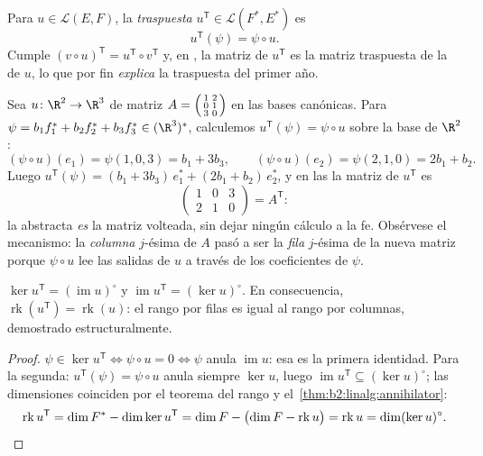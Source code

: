 \begin{definition}\label{def:b2:linalg:transpose}
Para $u \in \mathcal{L}(E, F)$, la \emph{traspuesta} $u^{\mathsf T} \in \mathcal{L}(F^*, E^*)$ es
\[
u^{\mathsf T}(\psi) = \psi \circ u .
\]
Cumple $(v \circ u)^{\mathsf T} = u^{\mathsf T} \circ v^{\mathsf T}$ y,
en , la matriz de $u^{\mathsf T}$ es la matriz
traspuesta de la de $u$, lo que por fin \emph{explica} la traspuesta
del primer año.
\end{definition}

\begin{example}\label{ex:b2:linalg:transposework}
Sea $u \colon \R^2 \to \R^3$ de matriz $A =
\begin{psmallmatrix} 1 & 2\\ 0 & 1\\ 3 & 0\end{psmallmatrix}$ en
las bases canónicas. Para $\psi = b_1f_1^* + b_2f_2^* + b_3f_3^*
\in (\R^3)^*$, calculemos $u^{\mathsf T}(\psi) = \psi \circ u$
sobre la base de $\R^2$:
\[
(\psi \circ u)(e_1) = \psi(1, 0, 3) = b_1 + 3b_3,
\qquad
(\psi \circ u)(e_2) = \psi(2, 1, 0) = 2b_1 + b_2 .
\]
Luego $u^{\mathsf T}(\psi) = (b_1 + 3b_3)\,e_1^* + (2b_1 +
b_2)\,e_2^*$, y en las  la matriz de $u^{\mathsf T}$
es
\[
\begin{pmatrix} 1 & 0 & 3\\ 2 & 1 & 0\end{pmatrix}
= A^{\mathsf T} :
\]
la  abstracta \emph{es} la matriz volteada, sin dejar
ningún cálculo a la fe. Obsérvese el mecanismo: la \emph{columna}
$j$-ésima de $A$ pasó a ser la \emph{fila} $j$-ésima de la nueva
matriz porque $\psi \circ u$ lee las salidas de $u$ a través de los
coeficientes de $\psi$.
\end{example}

\begin{proposition}\label{prop:b2:linalg:transposerank}
$\ker u^{\mathsf T} = (\operatorname{im} u)^{\circ}$ y
$\operatorname{im} u^{\mathsf T} = (\ker u)^{\circ}$. En
consecuencia, $\operatorname{rk}(u^{\mathsf T}) =
\operatorname{rk}(u)$: el rango por filas es igual al rango por
columnas, demostrado estructuralmente.
\end{proposition}

\begin{proof}
$\psi \in \ker u^{\mathsf T} \iff \psi \circ u = 0 \iff \psi$ anula
$\operatorname{im} u$: esa es la primera identidad. Para la segunda:
$u^{\mathsf T}(\psi) = \psi \circ u$ anula siempre $\ker u$, luego
$\operatorname{im} u^{\mathsf T} \subseteq (\ker u)^\circ$; las
dimensiones coinciden por el teorema del rango y el~\cref{thm:b2:linalg:annihilator}:
\[
\operatorname{rk} u^{\mathsf T} = \dim F^* - \dim\ker u^{\mathsf T}
= \dim F - \bigl(\dim F - \operatorname{rk} u\bigr)
= \operatorname{rk} u
= \dim (\ker u)^{\circ} . \qedhere
\]
\end{proof}

